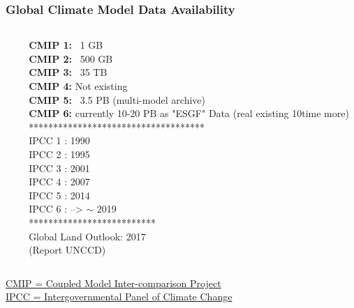 \begin{frame}

\frametitle{Global Climate Model Data Availability}

\begin{columns}[T] %
\begin{column}{.4\textwidth}
	\vspace{1cm}
\end{column}%
\hfill%
\begin{column}{.38\textwidth}
\textbf{CMIP 1:}  ~1 GB\\ %
\textbf{CMIP 2:} ~500 GB\\ %
\textbf{CMIP 3:} ~35 TB\\%
\textbf{CMIP 4:} Not existing\\
\textbf{CMIP 5:} ~3.5 PB (multi-model archive)\\ %
\textbf{CMIP 6:} currently 10-20 PB as "ESGF" Data (real existing 10time more) \\

************************************\\
IPCC 1 : 1990\\
IPCC 2 : 1995\\
IPCC 3 : 2001\\
IPCC 4 : 2007\\
IPCC 5 : 2014\\
IPCC 6 : --> $\sim$ 2019\\
**************************\\
Global Land Outlook: 2017 \\
(Report UNCCD)
\end{column}%
\end{columns}
\vspace{0.5cm}
\href{https://cmip.llnl.gov/}{CMIP = Coupled Model Inter-comparison Project}\\
\href{http://www.ipcc.ch/}{IPCC = Intergovernmental Panel of Climate Change}

\end{frame}


